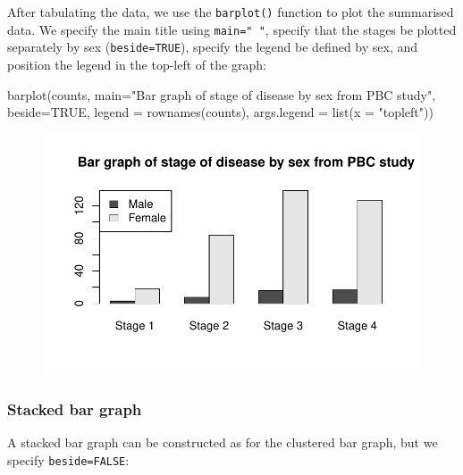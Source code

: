 \documentclass[
  a4paper,
]{memoir}
\newenvironment{Shaded}{\begin{snugshade}}{\end{snugshade}}
\newcommand{\AttributeTok}[1]{\textcolor[rgb]{0.00,0.00,0.00}{#1}}
\newcommand{\ConstantTok}[1]{\textcolor[rgb]{0.00,0.00,0.00}{#1}}
\newcommand{\FunctionTok}[1]{\textcolor[rgb]{0.00,0.00,0.00}{#1}}
\newcommand{\NormalTok}[1]{\textcolor[rgb]{0.00,0.00,0.00}{#1}}
\newcommand{\StringTok}[1]{\textcolor[rgb]{0.00,0.00,0.00}{#1}}
\begin{document}
After tabulating the data, we use the \texttt{barplot()} function to
plot the summarised data. We specify the main title using
\texttt{main="\ "}, specify that the stages be plotted separately by sex
(\texttt{beside=TRUE}), specify the legend be defined by sex, and
position the legend in the top-left of the graph:

\begin{Shaded}
\begin{Highlighting}[]
\FunctionTok{barplot}\NormalTok{(counts, }\AttributeTok{main=}\StringTok{"Bar graph of stage of disease by sex from PBC study"}\NormalTok{,}
        \AttributeTok{beside=}\ConstantTok{TRUE}\NormalTok{, }\AttributeTok{legend =} \FunctionTok{rownames}\NormalTok{(counts), }\AttributeTok{args.legend =} \FunctionTok{list}\NormalTok{(}\AttributeTok{x =} \StringTok{"topleft"}\NormalTok{))}
\end{Highlighting}
\end{Shaded}

\begin{figure}[H]

{\centering \includegraphics{01-intro_files/figure-pdf/unnamed-chunk-103-1.pdf}

}

\end{figure}

\hypertarget{stacked-bar-graph-1}{%
\subsubsection{Stacked bar graph}\label{stacked-bar-graph-1}}

A stacked bar graph can be constructed as for the clustered bar graph,
but we specify \texttt{beside=FALSE}:
\end{document}
